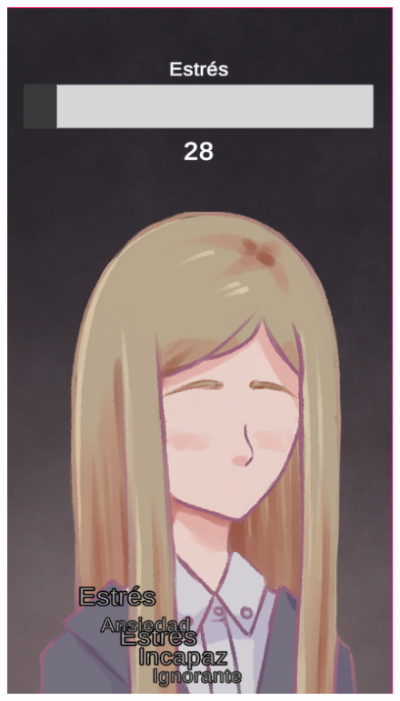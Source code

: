 \begin{figure}[h]
	\centering
	\begin{minipage}{0.45\textwidth}
   		\includegraphics[scale=.5]{imgs/screenshot03.png}
	\end{minipage}
	\begin{minipage}{0.45\textwidth}
		\begin{flushright}

\end{flushright}
\end{minipage}
\end{figure}
